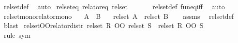 \begin{isabellebody}
\ rel{\isacharunderscore}{\kern0pt}set{\isacharunderscore}{\kern0pt}def\ \isamarkupfalse%
\ auto%
\endisatagproof
{\isafoldproof}%
%
\isadelimproof
\isanewline
%
\endisadelimproof
\isanewline
{}\isamarkupfalse%
\ rel{\isacharunderscore}{\kern0pt}set{\isacharunderscore}{\kern0pt}eq\ {\isacharbrackleft}{\kern0pt}relator{\isacharunderscore}{\kern0pt}eq{\isacharbrackright}{\kern0pt}{\isacharcolon}{\kern0pt}\ {\isachardoublequoteopen}rel{\isacharunderscore}{\kern0pt}set\ {\isacharparenleft}{\kern0pt}{\isacharequal}{\kern0pt}{\isacharparenright}{\kern0pt}\ {\isacharequal}{\kern0pt}\ {\isacharparenleft}{\kern0pt}{\isacharequal}{\kern0pt}{\isacharparenright}{\kern0pt}{\isachardoublequoteclose}\isanewline
%
\isadelimproof
\ \ %
\endisadelimproof
%
\isatagproof
{}\isamarkupfalse%
\ rel{\isacharunderscore}{\kern0pt}set{\isacharunderscore}{\kern0pt}def\ fun{\isacharunderscore}{\kern0pt}eq{\isacharunderscore}{\kern0pt}iff\ \isamarkupfalse%
\ auto%
\endisatagproof
{\isafoldproof}%
%
\isadelimproof
\isanewline
%
\endisadelimproof
\isanewline
{}\isamarkupfalse%
\ rel{\isacharunderscore}{\kern0pt}set{\isacharunderscore}{\kern0pt}mono{\isacharbrackleft}{\kern0pt}relator{\isacharunderscore}{\kern0pt}mono{\isacharbrackright}{\kern0pt}{\isacharcolon}{\kern0pt}\isanewline
\ \ \ {\isachardoublequoteopen}A\ {\isasymle}\ B{\isachardoublequoteclose}\isanewline
\ \ \ {\isachardoublequoteopen}rel{\isacharunderscore}{\kern0pt}set\ A\ {\isasymle}\ rel{\isacharunderscore}{\kern0pt}set\ B{\isachardoublequoteclose}\isanewline
%
\isadelimproof
\ \ %
\endisadelimproof
%
\isatagproof
{}\isamarkupfalse%
\ assms\ \isamarkupfalse%
\ rel{\isacharunderscore}{\kern0pt}set{\isacharunderscore}{\kern0pt}def\ \isamarkupfalse%
\ blast%
\endisatagproof
{\isafoldproof}%
%
\isadelimproof
\isanewline
%
\endisadelimproof
\isanewline
{}\isamarkupfalse%
\ rel{\isacharunderscore}{\kern0pt}set{\isacharunderscore}{\kern0pt}OO{\isacharbrackleft}{\kern0pt}relator{\isacharunderscore}{\kern0pt}distr{\isacharbrackright}{\kern0pt}{\isacharcolon}{\kern0pt}\ {\isachardoublequoteopen}rel{\isacharunderscore}{\kern0pt}set\ R\ OO\ rel{\isacharunderscore}{\kern0pt}set\ S\ {\isacharequal}{\kern0pt}\ rel{\isacharunderscore}{\kern0pt}set\ {\isacharparenleft}{\kern0pt}R\ OO\ S{\isacharparenright}{\kern0pt}{\isachardoublequoteclose}\isanewline
%
\isadelimproof
\ \ %
\endisadelimproof
%
\isatagproof
{}\isamarkupfalse%
\ {\isacharparenleft}{\kern0pt}rule\ sym{\isacharparenright}{\kern0pt}\isanewline

\end{isabellebody}
